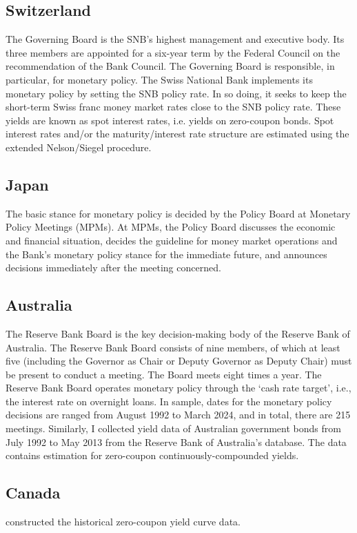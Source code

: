 \subsection{Switzerland}
The Governing Board is the SNB's highest management and executive body. Its three members are appointed for a six-year term by the Federal Council on the recommendation of the Bank Council. The Governing Board is responsible, in particular, for monetary policy. The Swiss National Bank implements its monetary policy by setting the SNB policy rate. In so doing, it seeks to keep the short-term Swiss franc money market rates close to the SNB policy rate. These yields are known as spot interest rates, i.e. yields on zero-coupon bonds. Spot interest rates and/or the maturity/interest rate structure are estimated using the extended Nelson/Siegel procedure.

\subsection{Japan}
The basic stance for monetary policy is decided by the Policy Board at Monetary Policy Meetings (MPMs). At MPMs, the Policy Board discusses the economic and financial situation, decides the guideline for money market operations and the Bank's monetary policy stance for the immediate future, and announces decisions immediately after the meeting concerned.

\subsection{Australia}

The Reserve Bank Board is the key decision-making body of the Reserve Bank of Australia. The Reserve Bank Board consists of nine members, of which at least five (including the Governor as Chair or Deputy Governor as Deputy Chair) must be present to conduct a meeting. The Board meets eight times a year. The Reserve Bank Board operates monetary policy through the `cash rate target', i.e., the interest rate on overnight loans. In sample, dates for the monetary policy decisions are ranged from August 1992 to March 2024, and in total, there are 215 meetings. Similarly, I collected yield data of Australian government bonds from July 1992 to May 2013 from the Reserve Bank of Australia's database. The data contains estimation for zero-coupon continuously-compounded yields.

\subsection{Canada}

\citet{bolder2004empirical} constructed the historical zero-coupon yield curve data.